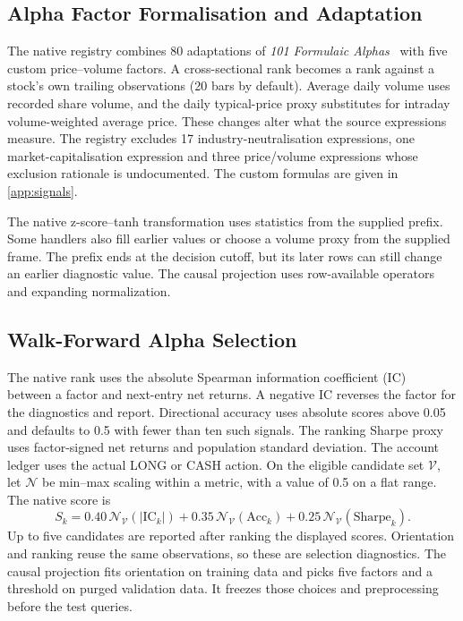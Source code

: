 \subsection{Alpha Factor Formalisation and Adaptation}
\label{sec:alpha-representation}
The native registry combines 80 adaptations of
\emph{101 Formulaic Alphas}~\cite{kakushadze2016formulaic} with five
custom price--volume factors. A cross-sectional rank becomes a rank
against a stock's own trailing observations (20 bars by default).
Average daily volume uses recorded share volume, and the daily
typical-price proxy substitutes for intraday volume-weighted average price.
These changes alter what the source expressions measure. The registry
excludes 17 industry-neutralisation expressions, one market-capitalisation
expression and three price/volume expressions whose exclusion rationale is
undocumented. The custom formulas are given in \ref{app:signals}.

The native z-score--tanh transformation uses statistics from the supplied
prefix. Some handlers also fill earlier values or choose a volume proxy
from the supplied frame. The prefix ends at the decision cutoff, but its
later rows can still change an earlier diagnostic value. The causal
projection uses row-available operators and expanding normalization.

\subsection{Walk-Forward Alpha Selection}
The native rank uses the absolute Spearman information
coefficient (IC)~\cite{grinold1999active} between a factor and next-entry
net returns. A negative IC reverses the factor for the diagnostics and
report. Directional accuracy uses absolute scores above 0.05 and defaults
to 0.5 with fewer than ten such signals. The ranking Sharpe proxy uses
factor-signed net returns and population standard deviation. The account
ledger uses the actual LONG or CASH action. On the eligible candidate set \(\mathcal V\), let \(\mathcal N\)
be min--max scaling within a metric, with a value of 0.5 on a flat range.
The native score is
\begin{equation}
  S_k=0.40\,\mathcal N_{\mathcal V}(|\mathrm{IC}_k|)
      +0.35\,\mathcal N_{\mathcal V}(\mathrm{Acc}_k)
      +0.25\,\mathcal N_{\mathcal V}(\mathrm{Sharpe}_k).
  \label{eq:composite}
\end{equation}
Up to five candidates are reported after ranking the displayed scores.
Orientation and ranking reuse the same observations, so these are
selection diagnostics. The causal projection fits orientation on training
data and picks five factors and a threshold on purged validation data.
It freezes those choices and preprocessing before the test queries.

